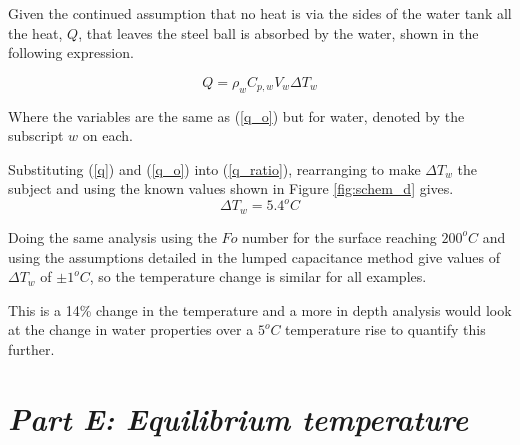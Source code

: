 \documentclass[11pt]{article}
\begin{document}
Given the continued assumption that no heat is via the sides of the water tank all the heat, $Q$, that leaves the steel ball is absorbed by the water, shown in the following expression.

\begin{equation}\label{q}
	Q = \rho_w C_{p,w} V_w \Delta T_{w}
\end{equation}

Where the variables are the same as (\ref{q_o}) but for water, denoted by the subscript $w$ on each.

Substituting (\ref{q}) and (\ref{q_o}) into (\ref{q_ratio}), rearranging to make $\Delta T_w$ the subject and using the known values shown in Figure \ref{fig:schem_d} gives.
\begin{equation}\label{delta_t}
	\Delta T_w = 5.4 ^oC
\end{equation}

Doing the same analysis using the $Fo$ number for the surface reaching $200^oC$ and using the assumptions detailed in the lumped capacitance method give values of $\Delta T_w$ of $\pm1^oC$, so the temperature change is similar for all examples.

This is a 14\% change in the temperature and a more in depth analysis would look at the change in water properties over a $5^oC$ temperature rise to quantify this further.

\FloatBarrier
\section{\emph{Part E: Equilibrium temperature}}



\end{document}
